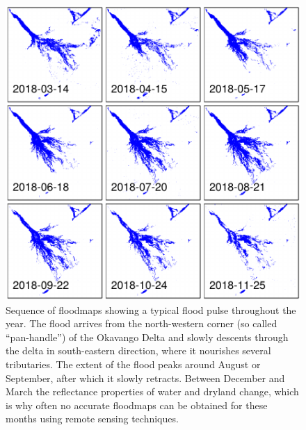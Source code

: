 \documentclass[abstract=on,10pt,a4paper,bibliography=totocnumbered]{scrartcl}
\begin{document}
\begin{figure}[h]
  \begin{center}
    \includegraphics[width = \textwidth]{99_FloodPulse.pdf}
    \caption{Sequence of floodmaps showing a typical flood pulse throughout the
    year. The flood arrives from the north-western corner (so called
    ``pan-handle'') of the Okavango Delta and slowly descents through the delta
    in south-eastern direction, where it nourishes several tributaries. The
    extent of the flood peaks around August or September, after which it slowly
    retracts. Between December and March the reflectance properties of water and
    dryland change, which is why often no accurate floodmaps can be obtained for
    these months using remote sensing techniques.}
    \label{FloodPulse}
  \end{center}
\end{figure}

\newpage
\end{document}
